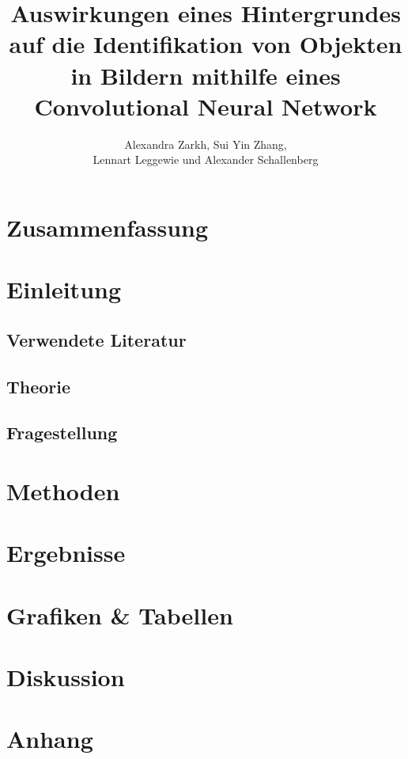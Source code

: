 \documentclass[paper=A4,pagesize=auto,12pt,headinclude=true,footinclude=true,BCOR=0mm,DIV=calc]{scrartcl}
\title{Auswirkungen eines Hintergrundes auf die Identifikation von Objekten in Bildern mithilfe eines Convolutional Neural Network}
\author{Alexandra Zarkh, Sui Yin Zhang,\\ Lennart Leggewie und Alexander Schallenberg}
\begin{document}
\begin{titlepage}
	\maketitle
\end{titlepage}

\tableofcontents
\newpage


\section{Zusammenfassung}


\section{Einleitung}

\subsection{Verwendete Literatur}

\subsection{Theorie}

\subsection{Fragestellung}


\section{Methoden}


\section{Ergebnisse}


\section{Grafiken \& Tabellen}


\section{Diskussion}


\printbibliography[heading=bibnumbered]


\section{Anhang}
\end{document}
